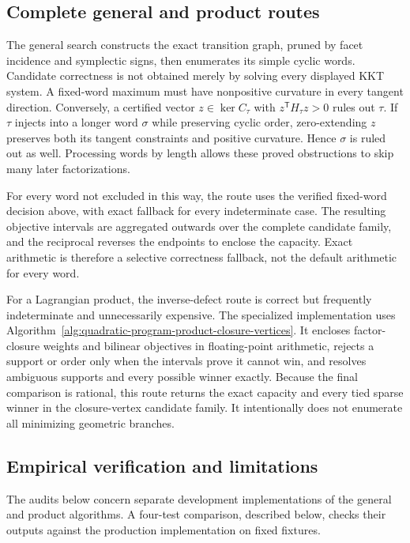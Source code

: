 \subsection{Complete general and product routes}

The general search constructs the exact transition graph, pruned by facet
incidence and symplectic signs, then enumerates its simple cyclic words. Candidate
correctness is not obtained merely by solving every displayed KKT system.  A
fixed-word maximum must have nonpositive curvature in every tangent direction.
Conversely, a certified vector \(z\in\ker C_\tau\) with
\(z^{\mathsf T}H_\tau z>0\) rules out \(\tau\).  If \(\tau\) injects into a
longer word \(\sigma\) while preserving cyclic order, zero-extending \(z\)
preserves both its tangent constraints and positive curvature.  Hence
\(\sigma\) is ruled out as well.  Processing words by length allows these
proved obstructions to skip many later factorizations.

For every word not excluded in this way, the route uses the verified
fixed-word decision above, with exact fallback for every indeterminate case.
The resulting objective intervals are aggregated outwards over the complete
candidate family, and the reciprocal reverses the endpoints to enclose the
capacity.  Exact arithmetic is therefore a selective correctness fallback,
not the default arithmetic for every word.

For a Lagrangian product, the inverse-defect route is correct but frequently
indeterminate and unnecessarily expensive.  The specialized implementation
uses Algorithm~\ref{alg:quadratic-program-product-closure-vertices}.  It
encloses factor-closure weights and bilinear objectives in floating-point
arithmetic, rejects a support or order only when the intervals prove it cannot
win, and resolves ambiguous supports and every possible winner exactly.
Because the final comparison is rational, this route returns the exact
capacity and every tied sparse winner in the closure-vertex candidate family.
It intentionally does not enumerate all minimizing geometric branches.

\subsection{Empirical verification and limitations}

The audits below concern separate development implementations of the general
and product algorithms. A four-test comparison, described below, checks their
outputs against the production implementation on fixed fixtures.

